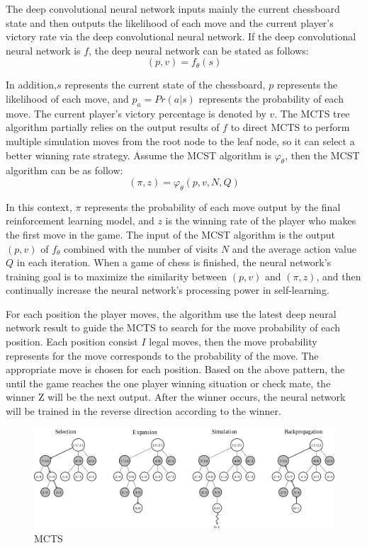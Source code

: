 \documentclass[10pt,twocolumn]{article}
\begin{document}
	The deep convolutional neural network inputs mainly the current chessboard state and then outputs the likelihood of each move and the current player's victory rate via the deep convolutional neural network.\cite{MCTSAG} If the deep convolutional neural network is \(f\), the deep neural network can be stated as follows:
	\[(p,v)=f_\theta(s)\]
	
	In addition,\(s\) represents the current state of the chessboard, \(p\) represents the likelihood of each move, and $p_a = Pr (a|s)$ represents the probability of each move. The current player's victory percentage is denoted by \(v\). The MCTS tree algorithm partially relies on the output results of \(f\) to direct MCTS to perform multiple simulation moves from the root node to the leaf node, so it can select a better winning rate strategy. Assume the MCST algorithm is \(\varphi_\theta\), then the MCST algorithm can be as follow:
	\[(\pi,z)=\varphi_\theta(p,v,N,Q)\]\cite{EMCTSXQ}
	
	In this context, \(\pi\) represents the probability of each move output by the final reinforcement learning model, and \(z\) is the winning rate of the player who makes the first move in the game.\cite{Wenzhi} The input of the MCST algorithm is the output \((p,v)\) of \(f_\theta\) combined with the number of visits \(N\) and the average action value \(Q\) in each iteration. When a game of chess is finished, the neural network's training goal is to maximize the similarity between $(p, v)$ and $(\pi, z)$, and then continually increase the neural network's processing power in self-learning.
	
	For each position the player moves, the algorithm use the latest deep neural network result to guide the MCTS to search for the move probability of each position. Each position consist \(I\) legal moves, then the move probability represents for the move corresponds to the probability of the move. The appropriate move is chosen for each position. Based on the above pattern, the until the game reaches the one player winning situation or check mate, the winner Z will be the next output. After the winner occurs, the neural network will be trained in the reverse direction according to the winner.
	
	\begin{figure}
        \includegraphics[width=\linewidth]{MCTS.png}
        \caption{MCTS}
        \label{fig1:Monte Carlo Tree search}
    \end{figure}
	
\end{document}
